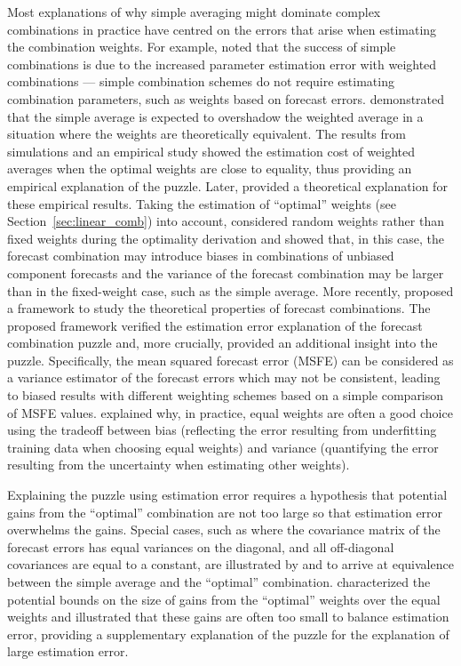 \documentclass[11pt]{article}
\begin{document}
Most explanations of why simple averaging might dominate complex combinations in practice have centred on the errors that arise when estimating the combination weights. For example, \citet{Timmermann2006-en} noted that the success of simple combinations is due to the increased parameter estimation error with weighted combinations --- simple combination schemes do not require estimating combination parameters, such as weights based on forecast errors. \citet{Smith2009-wd} demonstrated that the simple average is expected to overshadow the weighted average in a situation where the weights are theoretically equivalent. The results from simulations and an empirical study showed the estimation cost of weighted averages when the optimal weights are close to equality, thus providing an empirical explanation of the puzzle. Later, \citet{Claeskens2016-pv} provided a theoretical explanation for these empirical results. Taking the estimation of ``optimal'' weights (see Section~\ref{sec:linear_comb}) into account, \citet{Claeskens2016-pv} considered random weights rather than fixed weights during the optimality derivation and showed that, in this case, the forecast combination may introduce biases in combinations of unbiased component forecasts and the variance of the forecast combination may be larger than in the fixed-weight case, such as the simple average. More recently, \citet{Chan2018-jl} proposed a framework to study the theoretical properties of forecast combinations. The proposed framework verified the estimation error explanation of the forecast combination puzzle and, more crucially, provided an additional insight into the puzzle. Specifically, the mean squared forecast error (MSFE) can be considered as a variance estimator of the forecast errors which may not be consistent, leading to biased results with different weighting schemes based on a simple comparison of MSFE values. \citet{Blanc2020-pg} explained why, in practice, equal weights are often a good choice using the tradeoff between bias (reflecting the error resulting from underfitting training data when choosing equal weights) and variance (quantifying the error resulting from the uncertainty when estimating other weights).

Explaining the puzzle using estimation error requires a hypothesis that potential gains from the ``optimal'' combination are not too large so that estimation error overwhelms the gains. Special cases, such as where the covariance matrix of the forecast errors has equal variances on the diagonal, and all off-diagonal covariances are equal to a constant, are illustrated by \citet{Timmermann2006-en} and \citet{Hsiao2014-ug} to arrive at equivalence between the simple average and the ``optimal'' combination. \citet{Elliott2011-ab} characterized the potential bounds on the size of gains from the ``optimal'' weights over the equal weights and illustrated that these gains are often too small to balance estimation error, providing a supplementary explanation of the puzzle for the explanation of large estimation error.
\end{document}
